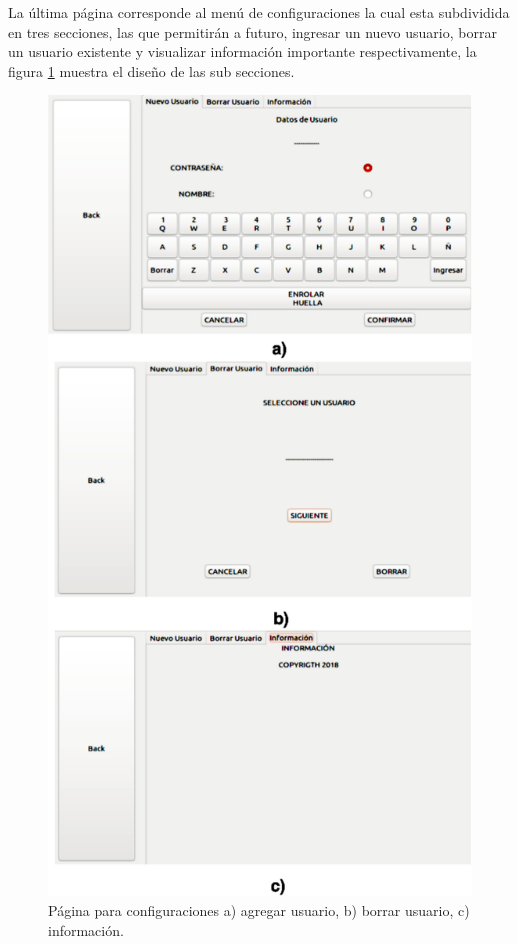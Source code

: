 La última página corresponde al menú de configuraciones la cual esta subdividida en tres secciones, las que permitirán a futuro, ingresar un nuevo usuario, borrar un usuario existente y visualizar información importante respectivamente, la figura \ref{fig:pagconfiguracion} muestra el diseño de las sub secciones.
\begin{figure}[H]
	\centering
	\includegraphics[scale=.7]{./Figures/pagconfuguracion.pdf}
	\caption{Página para configuraciones a) agregar usuario, b) borrar usuario, c) información.}
	\label{fig:pagconfiguracion}
\end{figure}

